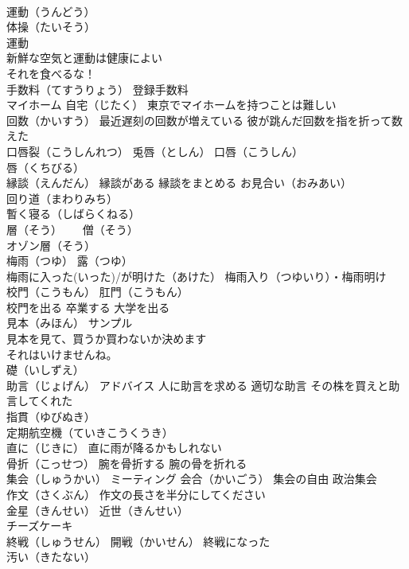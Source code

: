 \documentclass[8pt]{extreport}
\begin{document}
\begin{CJK}{UTF8}{min}
\\	運動（うんどう） 
\\	体操（たいそう） 
\\	運動 
\\	新鮮な空気と運動は健康によい
\\	それを食べるな！
\\	手数料（てすうりょう） 登録手数料
\\	マイホーム 自宅（じたく） 東京でマイホームを持つことは難しい
\\	回数（かいすう） 最近遅刻の回数が増えている 彼が跳んだ回数を指を折って数えた
\\	口唇裂（こうしんれつ） 兎唇（としん） 口唇（こうしん）
\\	唇（くちびる）
\\	縁談（えんだん） 縁談がある 縁談をまとめる お見合い（おみあい）
\\	回り道（まわりみち）
\\	暫く寝る（しばらくねる）
\\	層（そう）　　 僧（そう）
\\	オゾン層（そう）
\\	梅雨（つゆ） 露（つゆ）
\\	梅雨に入った(いった)/が明けた（あけた） 梅雨入り（つゆいり）・梅雨明け
\\	校門（こうもん） 肛門（こうもん） 
\\	校門を出る 卒業する 大学を出る
\\	見本（みほん） サンプル 
\\	見本を見て、買うか買わないか決めます
\\	それはいけませんね。
\\	礎（いしずえ）
\\	助言（じょげん） アドバイス 人に助言を求める 適切な助言 その株を買えと助言してくれた
\\	指貫（ゆびぬき）
\\	定期航空機（ていきこうくうき）
\\	直に（じきに） 直に雨が降るかもしれない
\\	骨折（こっせつ） 腕を骨折する 腕の骨を折れる
\\	集会（しゅうかい） ミーティング 会合（かいごう） 集会の自由 政治集会
\\	作文（さくぶん） 作文の長さを半分にしてください
\\	金星（きんせい） 近世（きんせい） 
\\	チーズケーキ
\\	終戦（しゅうせん） 開戦（かいせん） 終戦になった
\\	汚い（きたない）

\end{CJK}
\end{document}

